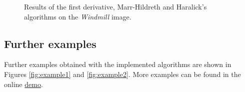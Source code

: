 \documentclass{ipol}
\numberwithin{equation}{section}
\numberwithin{table}{section}
\newcommand{\demourl}{http://dev.ipol.im/~juanc/ipol_demo/sc_edges/}
\begin{document}
\begin{figure}[h!]
	\quad
	
	\caption{Results of the first derivative, Marr-Hildreth and Haralick's algorithms on the \textit{Windmill} image.}
	\label{fig:result3}
\end{figure}

\clearpage


\subsection{Further examples}
\label{sec:examples}

Further examples obtained with the implemented algorithms are shown in Figures \ref{fig:example1} and \ref{fig:example2}. More examples can be found in the online \href{\demourl}{demo}.
\end{document}
